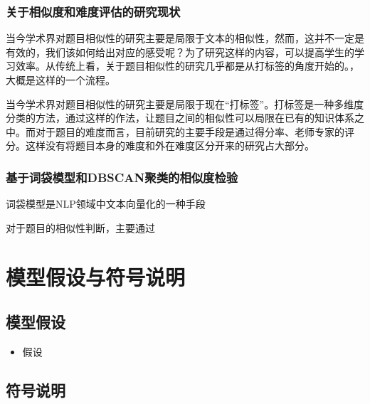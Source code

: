 \subsubsection{关于相似度和难度评估的研究现状}

当今学术界对题目相似性的研究主要是局限于文本的相似性，然而，这并不一定是有效的，我们该如何给出对应的感受呢？为了研究这样的内容，可以提高学生的学习效率。从传统上看，关于题目相似性的研究几乎都是从打标签的角度开始的。\cite{xuTimunandupinggufangfayanjiuzongshu2022}，大概是这样的一个流程。

当今学术界对题目相似性的研究主要是局限于现在“打标签”。打标签是一种多维度分类的方法，通过这样的作法，让题目之间的相似性可以局限在已有的知识体系之中。而对于题目的难度而言，目前研究的主要手段是通过得分率、老师专家的评分。这样没有将题目本身的难度和外在难度区分开来的研究占大部分。

\subsubsection{基于词袋模型和DBSCAN聚类的相似度检验}

词袋模型是NLP领域中文本向量化的一种手段

对于题目的相似性判断，主要通过

\subsubsection{}

%
%

\section{模型假设与符号说明}

\subsection{模型假设}

\begin{itemize}
    \item 假设 
\end{itemize}

\subsection{符号说明}